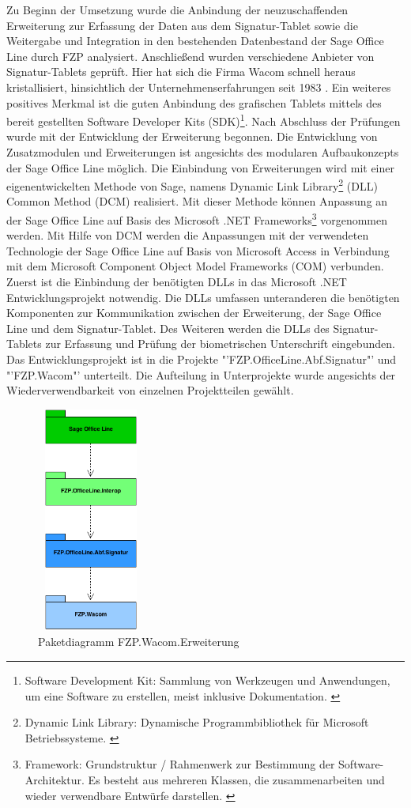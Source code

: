 Zu Beginn der Umsetzung wurde die Anbindung der neuzuschaffenden Erweiterung zur Erfassung der Daten aus dem Signatur-Tablet sowie die Weitergabe und Integration in den bestehenden Datenbestand der Sage Office Line durch FZP analysiert. Anschließend wurden verschiedene Anbieter von Signatur-Tablets geprüft. Hier hat sich die Firma Wacom schnell heraus kristallisiert, hinsichtlich der Unternehmenserfahrungen seit 1983 \cite{konzept1}. Ein weiteres positives Merkmal ist die guten Anbindung des grafischen Tablets mittels des bereit gestellten Software Developer Kits (SDK)\footnote{\label{foot:4}Software Development Kit: Sammlung von Werkzeugen und Anwendungen, um eine Software zu erstellen, meist inklusive Dokumentation. \cite{SDK}}. Nach Abschluss der Prüfungen wurde mit der Entwicklung der Erweiterung begonnen. Die Entwicklung von Zusatzmodulen und Erweiterungen ist angesichts des modularen Aufbaukonzepts der Sage Office Line möglich. Die Einbindung von Erweiterungen wird mit einer eigenentwickelten Methode von Sage, namens Dynamic Link Library\footnote{\label{foot:6}Dynamic Link Library: Dynamische Programmbibliothek für Microsoft Betriebssysteme. \cite{DLL}} (DLL) Common Method (DCM) realisiert. Mit dieser Methode können Anpassung an der Sage Office Line auf Basis des Microsoft .NET Frameworks\footnote{\label{foot:5}Framework: Grundstruktur / Rahmenwerk zur Bestimmung der 
Software-Architektur. Es besteht aus mehreren Klassen, die zusammenarbeiten und wieder verwendbare Entwürfe darstellen. \cite{framework}} vorgenommen werden. Mit Hilfe von DCM werden die Anpassungen mit der verwendeten Technologie der Sage Office Line auf Basis von Microsoft Access in Verbindung mit dem Microsoft Component Object Model Frameworks (COM) verbunden. Zuerst ist die Einbindung der benötigten DLLs in das Microsoft .NET Entwicklungsprojekt notwendig. Die DLLs umfassen unteranderen die benötigten Komponenten zur Kommunikation zwischen der Erweiterung, der Sage Office Line und dem Signatur-Tablet. Des Weiteren werden die DLLs des Signatur-Tablets zur Erfassung und Prüfung der biometrischen Unterschrift eingebunden. Das Entwicklungsprojekt ist in die Projekte "'FZP.OfficeLine.Abf.Signatur"' und "'FZP.Wacom"' unterteilt. Die Aufteilung in Unterprojekte wurde angesichts der Wiederverwendbarkeit von einzelnen Projektteilen gewählt.
\begin{figure}[!ht]
    \centering
    \includegraphics[height=210pt, width=100pt]{paketDiagrammNeu2.png}
    \caption[Paketdiagramm FZP.Wacom.Erweiterung]{\small{Paketdiagramm FZP.Wacom.Erweiterung}}
\end{figure}
